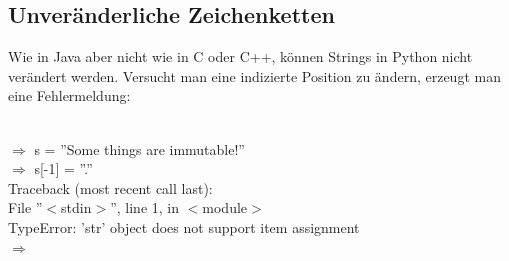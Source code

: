 \subsection{Unveränderliche Zeichenketten}
Wie in Java aber nicht wie in C oder C++, können Strings in Python nicht verändert werden. Versucht man eine indizierte Position zu ändern, erzeugt man eine Fehlermeldung: \\
\\
\begin{MyConsoleBox}{
${\Longrightarrow}$ s = ''Some things are immutable!'' \\
${\Longrightarrow}$ s[-1] = ''.'' \\
Traceback (most recent call last): \\
\hspace{0.2cm} File ''$<$stdin$>$'', line 1, in $<$module$>$ \\
TypeError: 'str' object does not support item assignment \\
${\Longrightarrow}$ \\
}\end{MyConsoleBox}
\\

